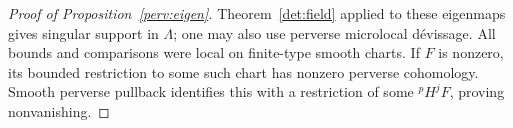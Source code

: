 \begin{proof}[Proof of Proposition~\ref{perv:eigen}]
Theorem~\ref{det:field} applied to these eigenmaps gives singular
support in $\Lambda$; one may also use perverse microlocal d\'evissage.
All bounds and comparisons were local on finite-type smooth charts.
If $F$ is nonzero, its bounded restriction to some such chart has
nonzero perverse cohomology.  Smooth perverse pullback identifies this
with a restriction of some ${}^pH^jF$, proving nonvanishing.
\end{proof}
